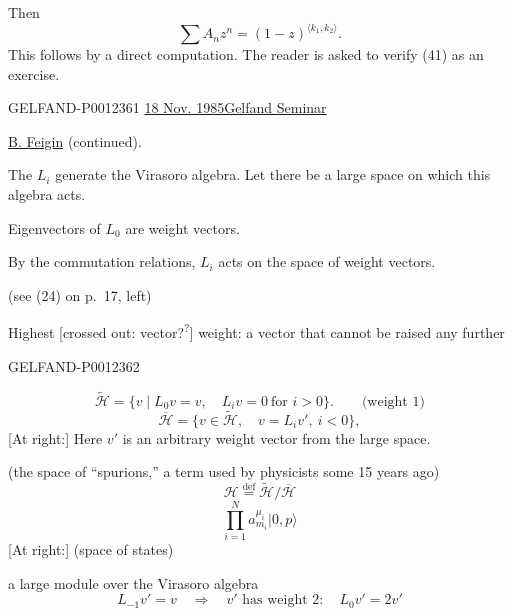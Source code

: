 Then
\begin{equation*}
\sum A_n z^n=(1-z)^{\langle k_1,k_2\rangle}.
\tag{41}
\end{equation*}
This follows by a direct computation. The reader is asked to verify (41) as an exercise.


\begin{GelfandAdjacentEvidence}{GELFAND-P001236}{1}
\underline{18 Nov. 1985}\qquad \underline{Gelfand Seminar}

\underline{B. Feigin} (continued).

The $L_i$ generate the Virasoro algebra. Let there be a large space on which this algebra acts.

Eigenvectors of $L_0$ are weight vectors.

By the commutation relations, $L_i$ acts on the space of weight vectors.

(see (24) on p.~17, left)

Highest [crossed out: vector?\textsuperscript{?}] weight: a vector that cannot be raised any further
\end{GelfandAdjacentEvidence}
\begin{GelfandAdjacentEvidence}{GELFAND-P001236}{2}

\begin{equation*}
\widetilde{\mathcal H}=\{v\mid L_0v=v,\quad L_iv=0\ \text{for }i>0\}.\qquad\text{(weight 1)}
\tag{1}
\end{equation*}
\begin{equation*}
\overline{\mathcal H}=\{v\in\widetilde{\mathcal H},\quad v=L_i v',\ i<0\},
\tag{2}
\end{equation*}
[At right:] Here $v'$ is an arbitrary weight vector from the large space.

(the space of “spurions,” a term used by physicists some 15 years ago)
\begin{equation*}
\mathcal H\overset{\mathrm{def}}{=}\widetilde{\mathcal H}/\overline{\mathcal H}
\tag{3}
\end{equation*}
\begin{equation*}
\prod_{i=1}^N a_{m_i}^{\mu_i}|0,p\rangle
\tag{4}
\end{equation*}
[At right:] (space of states)

a large module over the Virasoro algebra
\begin{equation*}
L_{-1}v'=v\quad\Rightarrow\quad v'\text{ has weight }2:\quad L_0v'=2v'
\tag{5}
\end{equation*}
\end{GelfandAdjacentEvidence}
